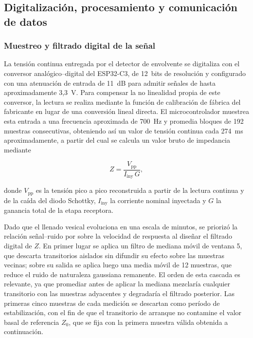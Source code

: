 \documentclass[12pt,a4paper]{article}
\begin{document}
\clearpage
\subsection{Digitalización, procesamiento y comunicación de datos}

\subsubsection{Muestreo y filtrado digital de la señal}

La tensión continua entregada por el detector de envolvente se digitaliza con el conversor
analógico--digital del ESP32-C3, de 12~bits de resolución y configurado con una atenuación de entrada
de 11~dB para admitir señales de hasta aproximadamente 3,3~V. Para compensar la no linealidad propia de
este conversor, la lectura se realiza mediante la función de calibración de fábrica del fabricante en
lugar de una conversión lineal directa. El microcontrolador muestrea esta entrada a una frecuencia
aproximada de 700~Hz y promedia bloques de 192 muestras consecutivas, obteniendo así un valor de tensión
continua cada 274~ms aproximadamente, a partir del cual se calcula un valor bruto de impedancia mediante

\begin{equation}
    Z=\frac{V_{\mathrm{pp}}}{I_{\mathrm{iny}}\,G},
\end{equation}

donde $V_{\mathrm{pp}}$ es la tensión pico a pico reconstruida a partir de la lectura continua y de la
caída del diodo Schottky, $I_{\mathrm{iny}}$ la corriente nominal inyectada y $G$ la ganancia total de la
etapa receptora.

Dado que el llenado vesical evoluciona en una escala de minutos, se priorizó la relación señal--ruido
por sobre la velocidad de respuesta al diseñar el filtrado digital de $Z$. En primer lugar se aplica un
filtro de mediana móvil de ventana 5, que descarta transitorios aislados sin difundir su efecto sobre las
muestras vecinas; sobre su salida se aplica luego una media móvil de 12 muestras, que reduce el ruido de
naturaleza gaussiana remanente. El orden de esta cascada es relevante, ya que promediar antes de aplicar
la mediana mezclaría cualquier transitorio con las muestras adyacentes y degradaría el filtrado
posterior. Las primeras cinco muestras de cada medición se descartan como período de estabilización, con
el fin de que el transitorio de arranque no contamine el valor basal de referencia $Z_0$, que se fija con
la primera muestra válida obtenida a continuación.
\end{document}
